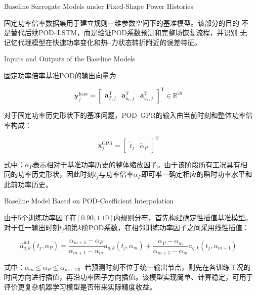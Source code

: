 {Baseline Surrogate Models under Fixed-Shape Power Histories}

固定功率倍率数据集用于建立规则一维参数空间下的基准模型。该部分的目的
不是替代后续POD--LSTM，而是验证POD系数预测和完整场恢复流程，并识别
无记忆代理模型在快速功率变化和热--力状态转折附近的误差特征。

{Inputs and Outputs of the Baseline Models}

固定功率倍率基准POD的输出向量为

\begin{equation}
	\boldsymbol y_j^{\mathrm{base}}
	=
	\begin{bmatrix}
		\boldsymbol a_{T,j}^{\mathrm T} &
		\boldsymbol a_{u_r,j}^{\mathrm T} &
		\boldsymbol a_{u_z,j}^{\mathrm T}
	\end{bmatrix}^{\mathrm T}
	\in\mathbb R^{28}
	\label{eq:baseline_surrogate_output}
\end{equation}

对于固定功率历史形状下的基准问题，POD--GPR的输入由当前时刻和整体功率倍率构成：

\begin{equation}
	\boldsymbol{x}_j^{\mathrm{GPR}}
	=
	\begin{bmatrix}
		\widetilde{t}_j &
		\widetilde{\alpha}_P
	\end{bmatrix}^{\mathrm T}
	\label{eq:baseline_gpr_features}
\end{equation}

式中：$\alpha_P$表示相对于基准功率历史的整体缩放因子。由于该阶段所有工况具有相同的功率历史形状，因此时刻$t_j$与功率倍率$\alpha_P$即可唯一确定相应的瞬时功率水平和此前功率历史。

{Baseline Model Based on POD-Coefficient Interpolation}

由于5个训练功率因子在$[0.90,1.10]$内规则分布，首先构建确定性插值基准模型。对于任一输出时刻$t_j$和第$k$阶POD系数，在相邻训练功率因子之间采用线性插值：

\begin{equation}
	\widehat{a}_{q,k}^{\mathrm{int}}(t_j,\alpha_P)
	=
	\frac{\alpha_{m+1}-\alpha_P}{\alpha_{m+1}-\alpha_m}
	a_{q,k}(t_j,\alpha_m)
	+
	\frac{\alpha_P-\alpha_m}{\alpha_{m+1}-\alpha_m}
	a_{q,k}(t_j,\alpha_{m+1})
	\label{eq:pod_coefficient_interpolation}
\end{equation}

式中：$\alpha_m\leq\alpha_P\leq\alpha_{m+1}$。若预测时刻不位于统一输出节点，则先在各训练工况的时间方向进行插值，再沿功率因子方向插值。该模型实现简单、计算稳定，可用于评价更复杂机器学习模型是否带来实际精度收益。

